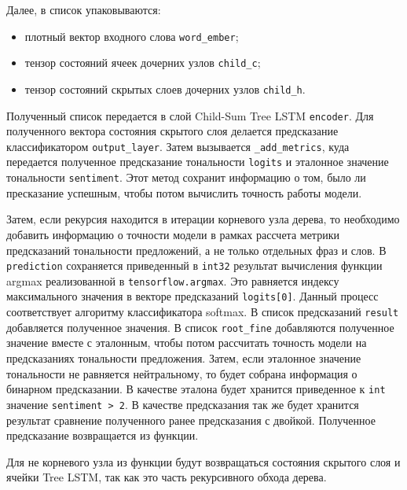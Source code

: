 Далее, в список упаковываются:
\begin{itemize}
\item плотный вектор входного слова \texttt{word\_ember};
\item тензор состояний ячеек дочерних узлов \texttt{child\_c};
\item тензор состояний скрытых слоев дочерних узлов \texttt{child\_h}.
\end{itemize}

Полученный список передается в слой Child-Sum Tree LSTM \texttt{encoder}. Для полученного вектора состояния скрытого слоя делается предсказание классификатором \texttt{output\_layer}. Затем вызывается \texttt{\_add\_metrics}, куда передается полученное предсказание тональности \texttt{logits} и эталонное значение тональности \texttt{sentiment}. Этот метод сохранит информацию о том, было ли пресказание успешным, чтобы потом вычислить точность работы модели.

Затем, если рекурсия находится в итерации корневого узла дерева, то необходимо добавить информацию о точности модели в рамках рассчета метрики предсказаний тональности предложений, а не только отдельных фраз и слов. В \texttt{prediction} сохраняется приведенный в \texttt{int32} результат вычисления функции argmax реализованной в \texttt{tensorflow.argmax}. Это равняется индексу максимального значения в векторе предсказаний \texttt{logits[0]}. Данный процесс соответствует алгоритму классификатора softmax. В список предсказаний \texttt{result} добавляется полученное значения. В список \texttt{root\_\-fine} добавляются полученное значение вместе с эталонным, чтобы потом рассчитать точность модели на предсказаниях тональности предложения. Затем, если эталонное значение тональности не равняется нейтральному, то будет собрана информация о бинарном предсказании. В качестве эталона будет хранится приведенное к \texttt{int} значение \texttt{sentiment > 2}. В качестве предсказания так же будет хранится результат сравнение полученного ранее предсказания с двойкой. Полученное предсказание возвращается из функции.

Для не корневого узла из функции будут возвращаться состояния скрытого слоя и ячейки Tree LSTM, так как это часть рекурсивного обхода дерева.

